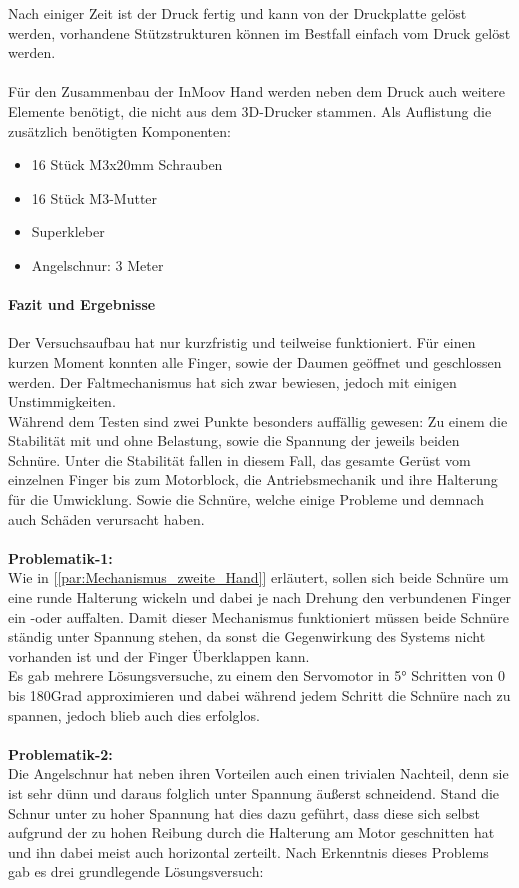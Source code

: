 \documentclass[titlepage,12pt,twoside]{article}
\begin{document}
Nach einiger Zeit ist der Druck fertig und kann von der Druckplatte gelöst werden, vorhandene Stützstrukturen können im Bestfall einfach vom Druck gelöst werden. \\
\\
Für den Zusammenbau der InMoov Hand werden neben dem Druck auch weitere Elemente benötigt, die nicht aus dem 3D-Drucker stammen. 
Als Auflistung die zusätzlich benötigten Komponenten:
\begin{itemize}
	\item 16 Stück M3x20mm Schrauben
	\item 16 Stück M3-Mutter
	\item Superkleber
	\item Angelschnur: 3 Meter
\end{itemize}

\paragraph{Fazit und Ergebnisse}
\hfill \break
\hfill \break
Der Versuchsaufbau hat nur kurzfristig und teilweise funktioniert. Für einen kurzen Moment konnten alle Finger, sowie der Daumen geöffnet und geschlossen werden. Der Faltmechanismus hat sich zwar bewiesen, jedoch mit einigen Unstimmigkeiten. \\
Während dem Testen sind zwei Punkte besonders auffällig gewesen: Zu einem die Stabilität mit und ohne Belastung, sowie die Spannung der jeweils beiden Schnüre. Unter die Stabilität fallen in diesem Fall, das gesamte Gerüst vom einzelnen Finger 
bis zum Motorblock, die Antriebsmechanik und ihre Halterung für die Umwicklung. Sowie die Schnüre, welche einige Probleme und demnach auch Schäden verursacht haben. \\
\\
\textbf{Problematik-1: } \\
Wie in [\textcolor{blue}{\autoref{par:Mechanismus_zweite_Hand}}] erläutert, sollen sich beide Schnüre um eine runde Halterung wickeln und dabei je nach Drehung den verbundenen Finger ein -oder auffalten. Damit dieser Mechanismus funktioniert müssen beide Schnüre 
ständig unter Spannung stehen, da sonst die Gegenwirkung des Systems nicht vorhanden ist und der Finger Überklappen kann. \\
Es gab mehrere Lösungsversuche, zu einem den Servomotor in 5° Schritten von 0 bis 180\textdegree Grad approximieren und dabei während jedem Schritt die Schnüre nach zu spannen, jedoch blieb auch dies erfolglos. \\
\\
\textbf{Problematik-2: } \\
Die Angelschnur hat neben ihren Vorteilen auch einen trivialen Nachteil, denn sie ist sehr dünn und daraus folglich unter Spannung äußerst schneidend. Stand die Schnur unter zu hoher Spannung hat dies dazu geführt, dass diese sich 
selbst aufgrund der zu hohen Reibung durch die Halterung am Motor geschnitten hat und ihn dabei meist auch horizontal zerteilt. Nach Erkenntnis dieses Problems gab es drei grundlegende Lösungsversuch:
\end{document}
